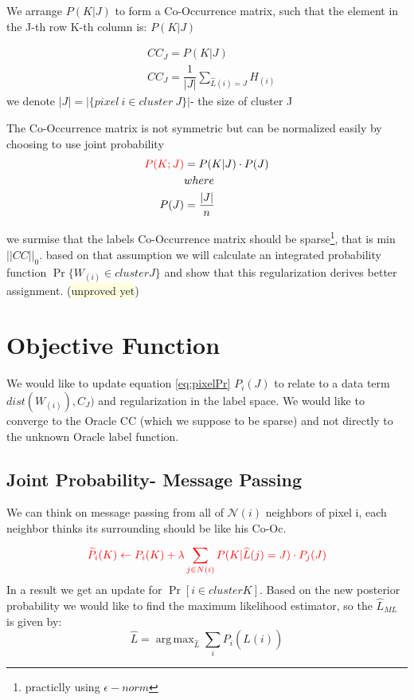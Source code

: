 \documentclass{article}
\DeclareMathOperator*{\argmax}{arg\,max}
\begin{document}
We arrange $ P(K|J) $ to form a Co-Occurrence matrix, such that the element in the J-th row K-th column is: $ P(K|J) $

\begin{align}
&CC_J= P(K|J)\label{eq:CoOc}\\
&CC_J=\dfrac{1}{|J|} \sum_{\hat{L}(i)=J}H_{(i)}\nonumber
\end{align}
we denote $ |J|=|\{pixel\ i\in cluster\ J\}| $- the size of cluster J

The Co-Occurrence matrix is not symmetric but can be normalized easily by choosing to use joint probability 
\begin{align}
\color{red}
P(K;J)&=P(K|J)\cdot P(J) \label{eq:jointprob}\\
&where\nonumber\\
P(J)&=\dfrac{\vert J\vert}{n} \nonumber
\end{align}


we surmise that the labels Co-Occurrence matrix should be sparse\footnote{practiclly using $ \epsilon-norm $}, that is min $||CC||_0$. based on that assumption we will calculate an integrated probability function $\Pr \{W_{(i)}\in cluster J\}$ and show that this regularization derives better assignment. (\colorbox{lightyellow}{unproved yet})


\section{Objective Function}
We would like to update equation \eqref{eq:pixelPr} $ P_{i}(J) $ to relate to a data term $ dist(W_{(i)} ),C_J) $ and regularization in the label space.
We would like to converge to the Oracle CC (which we suppose to be sparse) and not directly to the unknown Oracle label function.

\subsection{Joint Probability- Message Passing}
We can think on message passing from all of $\mathcal{N}(i)$ neighbors of pixel i, each neighbor thinks its surrounding should be like his Co-Oc.
\begin{equation}
\color{red}
\widetilde{P}_i(K) \leftarrow P_i(K) + \lambda\sum_{j\in N(i)}^{} P(K|\widehat{L}(j)=J)\cdot P_{j}(J)
\end{equation}
In a result we get an update for $ \Pr [i \in cluster K] $. Based on the new posterior probability we would like to find the maximum likelihood estimator, so the $ \hat{L}_{ML} $ is given by:
$$ \hat{L}=\argmax _{\hat{L}} \sum_{i}^{}P_i(\widehat{L}(i)) $$
\end{document}
